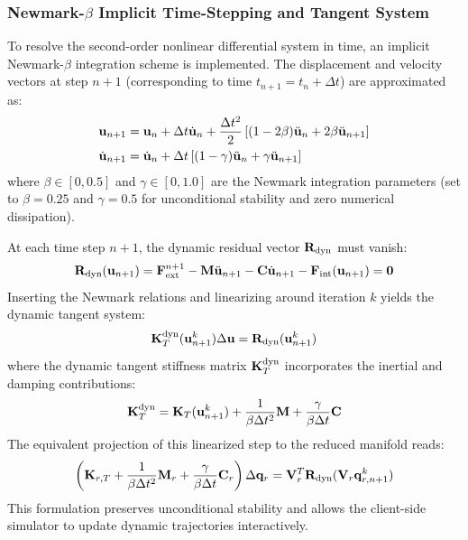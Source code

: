 \subsubsection{\texorpdfstring{Newmark-$\beta$}{Newmark-beta} Implicit Time-Stepping and Tangent System}
To resolve the second-order nonlinear differential system in time, an implicit Newmark-$\beta$ integration scheme is implemented. The displacement and velocity vectors at step $n+1$ (corresponding to time $t_{n+1} = t_n + \Delta t$) are approximated as:
\begin{align}
        \mathbf{u}_{n+1} &= \mathbf{u}_n + \Delta t \dot{\mathbf{u}}_n + \frac{\Delta t^2}{2} \left[ (1 - 2\beta)\ddot{\mathbf{u}}_n + 2\beta \ddot{\mathbf{u}}_{n+1} \right] \\
        \dot{\mathbf{u}}_{n+1} &= \dot{\mathbf{u}}_n + \Delta t \left[ (1 - \gamma)\ddot{\mathbf{u}}_n + \gamma \ddot{\mathbf{u}}_{n+1} \right]
\end{align}
where $\beta \in [0, 0.5]$ and $\gamma \in [0, 1.0]$ are the Newmark integration parameters (set to $\beta=0.25$ and $\gamma=0.5$ for unconditional stability and zero numerical dissipation). 

At each time step $n+1$, the dynamic residual vector $\mathbf{R}_{\text{dyn}}$ must vanish:
\begin{equation}
        \mathbf{R}_{\text{dyn}}(\mathbf{u}_{n+1}) = \mathbf{F}_{\text{ext}}^{n+1} - \mathbf{M} \ddot{\mathbf{u}}_{n+1} - \mathbf{C} \dot{\mathbf{u}}_{n+1} - \mathbf{F}_{\text{int}}(\mathbf{u}_{n+1}) = \mathbf{0}
\end{equation}
Inserting the Newmark relations and linearizing around iteration $k$ yields the dynamic tangent system:
\begin{equation}
        \mathbf{K}_T^{\text{dyn}}(\mathbf{u}_{n+1}^k) \Delta \mathbf{u} = \mathbf{R}_{\text{dyn}}(\mathbf{u}_{n+1}^k)
\end{equation}
where the dynamic tangent stiffness matrix $\mathbf{K}_T^{\text{dyn}}$ incorporates the inertial and damping contributions:
\begin{equation}
        \mathbf{K}_T^{\text{dyn}} = \mathbf{K}_T(\mathbf{u}_{n+1}^k) + \frac{1}{\beta \Delta t^2} \mathbf{M} + \frac{\gamma}{\beta \Delta t} \mathbf{C}
\end{equation}
The equivalent projection of this linearized step to the reduced manifold reads:
\begin{equation}
        \left( \mathbf{K}_{r,T} + \frac{1}{\beta \Delta t^2} \mathbf{M}_r + \frac{\gamma}{\beta \Delta t} \mathbf{C}_r \right) \Delta \mathbf{q}_r = \mathbf{V}_r^T \mathbf{R}_{\text{dyn}}(\mathbf{V}_r \mathbf{q}_{r,n+1}^k)
\end{equation}
This formulation preserves unconditional stability and allows the client-side simulator to update dynamic trajectories interactively.

